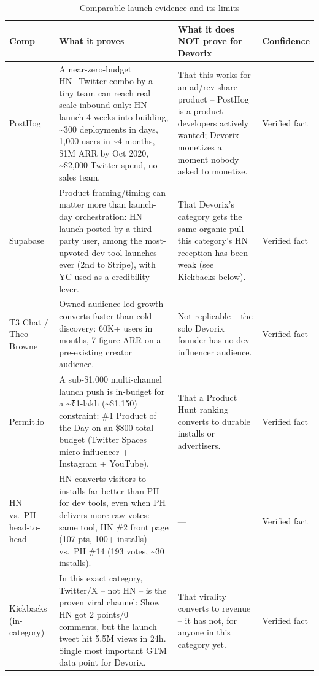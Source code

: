 \begin{table}[htbp]
\centering
\caption{Comparable launch evidence and its limits}
\label{tab:gtm-comps}
\begin{tabular}{@{}p{2.0cm}p{4.6cm}p{4.6cm}p{1.6cm}@{}}
\toprule
\textbf{Comp} & \textbf{What it proves} & \textbf{What it does NOT prove for Devorix} & \textbf{Confidence} \\
\midrule
PostHog & A near-zero-budget HN+Twitter combo by a tiny team can reach real scale inbound-only: HN launch 4 weeks into building, \textasciitilde300 deployments in days, 1{,}000 users in \textasciitilde4 months, \$1M ARR by Oct 2020, \textasciitilde\$2{,}000 Twitter spend, no sales team. & That this works for an ad/rev-share product -- PostHog is a product developers actively wanted; Devorix monetizes a moment nobody asked to monetize. & Verified fact \\
Supabase & Product framing/timing can matter more than launch-day orchestration: HN launch posted by a third-party user, among the most-upvoted dev-tool launches ever (2nd to Stripe), with YC used as a credibility lever. & That Devorix's category gets the same organic pull -- this category's HN reception has been weak (see Kickbacks below). & Verified fact \\
T3 Chat / Theo Browne & Owned-audience-led growth converts faster than cold discovery: 60K+ users in months, 7-figure ARR on a pre-existing creator audience. & Not replicable -- the solo Devorix founder has no dev-influencer audience. & Verified fact \\
Permit.io & A sub-\$1{,}000 multi-channel launch push is in-budget for a \textasciitilde₹1-lakh (\textasciitilde\$1{,}150) constraint: \#1 Product of the Day on an \$800 total budget (Twitter Spaces micro-influencer + Instagram + YouTube). & That a Product Hunt ranking converts to durable installs or advertisers. & Verified fact \\
HN vs.\ PH head-to-head & HN converts visitors to installs far better than PH for dev tools, even when PH delivers more raw votes: same tool, HN \#2 front page (107 pts, 100+ installs) vs.\ PH \#14 (193 votes, \textasciitilde30 installs). & --- & Verified fact \\
Kickbacks (in-category) & In this exact category, Twitter/X -- not HN -- is the proven viral channel: Show HN got 2 points/0 comments, but the launch tweet hit 5.5M views in 24h. Single most important GTM data point for Devorix. & That virality converts to revenue -- it has not, for anyone in this category yet. & Verified fact \\
\bottomrule
\end{tabular}
\end{table}

